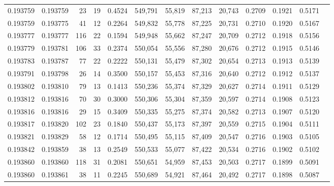 \begin{tabular}{rrrrrrrrrrrrr}
0.193759 & 0.193759 &    23 &  19 &                                     0.4524 & 549,791 &  55,819 &  87,213 &  20,743 & 0.2709 & 0.1921 & 0.5171 \\
0.193759 & 0.193775 &    41 &  12 &                                     0.2264 & 549,832 &  55,778 &  87,225 &  20,731 & 0.2710 & 0.1920 & 0.5167 \\
0.193777 & 0.193777 &   116 &  22 &                                     0.1594 & 549,948 &  55,662 &  87,247 &  20,709 & 0.2712 & 0.1918 & 0.5156 \\
0.193779 & 0.193781 &   106 &  33 &                                     0.2374 & 550,054 &  55,556 &  87,280 &  20,676 & 0.2712 & 0.1915 & 0.5146 \\
0.193783 & 0.193787 &    77 &  22 &                                     0.2222 & 550,131 &  55,479 &  87,302 &  20,654 & 0.2713 & 0.1913 & 0.5139 \\
0.193791 & 0.193798 &    26 &  14 &                                     0.3500 & 550,157 &  55,453 &  87,316 &  20,640 & 0.2712 & 0.1912 & 0.5137 \\
0.193802 & 0.193810 &    79 &  13 &                                     0.1413 & 550,236 &  55,374 &  87,329 &  20,627 & 0.2714 & 0.1911 & 0.5129 \\
0.193812 & 0.193816 &    70 &  30 &                                     0.3000 & 550,306 &  55,304 &  87,359 &  20,597 & 0.2714 & 0.1908 & 0.5123 \\
0.193816 & 0.193816 &    29 &  15 &                                     0.3409 & 550,335 &  55,275 &  87,374 &  20,582 & 0.2713 & 0.1907 & 0.5120 \\
0.193817 & 0.193820 &   102 &  23 &                                     0.1840 & 550,437 &  55,173 &  87,397 &  20,559 & 0.2715 & 0.1904 & 0.5111 \\
0.193821 & 0.193829 &    58 &  12 &                                     0.1714 & 550,495 &  55,115 &  87,409 &  20,547 & 0.2716 & 0.1903 & 0.5105 \\
0.193842 & 0.193859 &    38 &  13 &                                     0.2549 & 550,533 &  55,077 &  87,422 &  20,534 & 0.2716 & 0.1902 & 0.5102 \\
0.193860 & 0.193860 &   118 &  31 &                                     0.2081 & 550,651 &  54,959 &  87,453 &  20,503 & 0.2717 & 0.1899 & 0.5091 \\
0.193860 & 0.193861 &    38 &  11 &                                     0.2245 & 550,689 &  54,921 &  87,464 &  20,492 & 0.2717 & 0.1898 & 0.5087 \\

\end{tabular}
